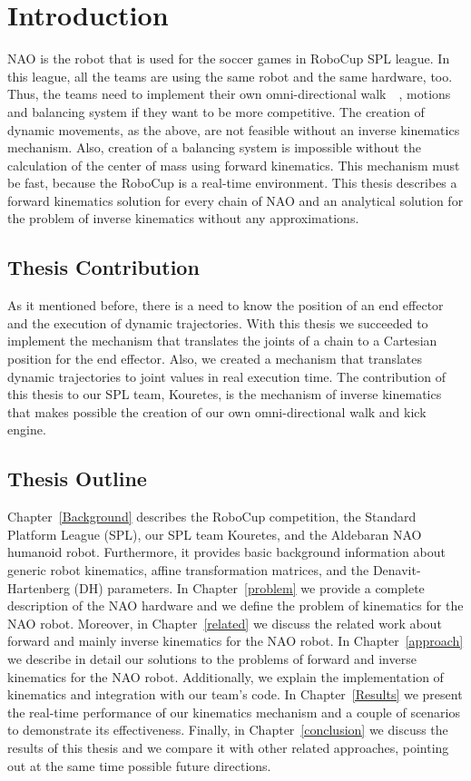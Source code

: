 \chapter{Introduction}
\label{intro}
NAO is the robot that is used for the soccer games in RoboCup SPL league. In this league, all the teams are using the same robot and the same hardware, too. Thus, the teams need to implement their own omni-directional walk~\cite{naowalk}~\cite{bhumanwalk}, motions and balancing system if they want to be more competitive. The creation of dynamic movements, as the above, are not feasible without an inverse kinematics mechanism. Also, creation of a balancing system is impossible without the calculation of the center of mass using forward kinematics. This mechanism must be fast, because the RoboCup is a real-time environment. This thesis describes a forward kinematics solution for every chain of NAO and an analytical solution for the problem of inverse kinematics without any approximations.

\section{Thesis Contribution}
As it mentioned before, there is a need to know the position of an end effector and the execution of dynamic trajectories. With this thesis we succeeded to implement the mechanism that translates the joints of a chain to a Cartesian position for the end effector. Also, we created a mechanism that translates dynamic trajectories to joint values in real execution time. The contribution of this thesis to our SPL team, Kouretes, is the mechanism of inverse kinematics that makes possible the creation of our own omni-directional walk and kick engine.

\section{Thesis Outline}
Chapter~\ref{Background} describes the RoboCup competition, the Standard Platform League (SPL), our SPL team Kouretes, and the Aldebaran NAO humanoid robot. Furthermore, it provides basic background information about  generic robot kinematics, affine transformation matrices, and the Denavit-Hartenberg (DH) parameters. In Chapter~\ref{problem} we provide a complete description of the NAO hardware and we define the problem of kinematics for the NAO robot. Moreover, in Chapter~\ref{related} we discuss the related work about forward and mainly inverse kinematics for the NAO robot. In Chapter~\ref{approach} we describe in detail our solutions to the problems of forward and inverse kinematics for the NAO robot. Additionally, we explain the implementation of kinematics and integration with our team's code. In Chapter~\ref{Results} we present the real-time performance of our kinematics mechanism and a couple of scenarios to demonstrate its effectiveness. Finally, in Chapter~\ref{conclusion} we discuss the results of this thesis and we compare it with other related approaches, pointing out at the same time possible future directions.

